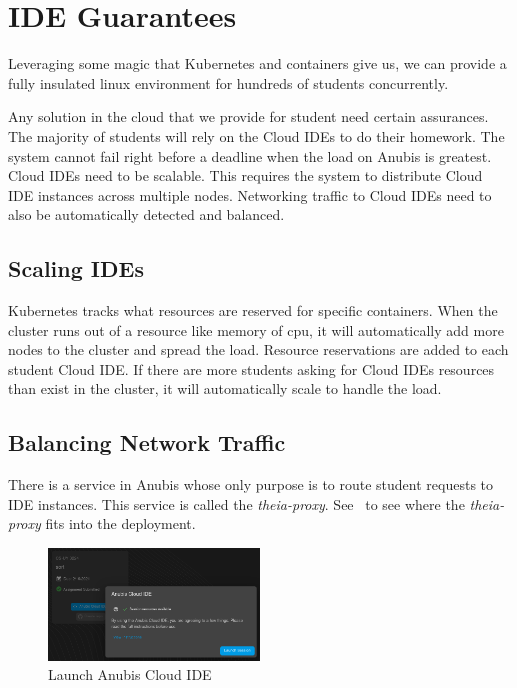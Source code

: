 \section{IDE Guarantees}\label{sec:ide-garantees}

Leveraging some magic that Kubernetes and containers give us,
we can provide a fully insulated linux environment for hundreds of
students concurrently.

Any solution in the cloud that we provide for student need certain assurances.
The majority of students will rely on the Cloud IDEs to do their homework.
The system cannot fail right before a deadline when the load on Anubis is greatest.
Cloud IDEs need to be scalable.
This requires the system to distribute Cloud IDE instances across multiple nodes. 
Networking traffic to Cloud IDEs need to also be automatically detected and balanced.

\subsection{Scaling IDEs}\label{subsec:scaling-ides}

Kubernetes tracks what resources are reserved for specific containers.
When the cluster runs out of a resource like memory of cpu, it will automatically
add more nodes to the cluster and spread the load.
Resource reservations are added to each student Cloud IDE.
If there are more students asking for Cloud IDEs resources than exist
in the cluster, it will automatically scale to handle the load.

\subsection{Balancing Network Traffic}\label{subsec:balancing-network-traffic}

There is a service in Anubis whose only purpose is to route
student requests to IDE instances. 
This service is called the \textit{theia-proxy}. 
See~ to see where the \textit{theia-proxy}
fits into the deployment.

\begin{figure}
    \centering
    \includegraphics[width=0.5\textwidth]{figures/theia1.png}
    \caption{Launch Anubis Cloud IDE\label{fig:theia1}}
\end{figure}

